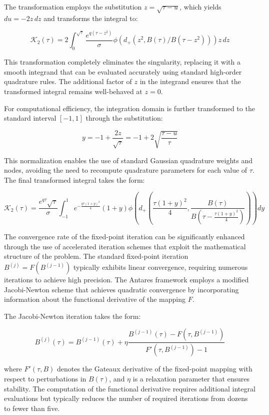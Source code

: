 \documentclass[
  american,
  11pt,
  11pt,
  letterpaper,
  onecolumn]{article}
\begin{document}
The transformation employs the substitution \(z = \sqrt{\tau - u}\),
which yields \(du = -2z \, dz\) and transforms the integral to:

\[\mathcal{K}_2(\tau) = 2\int_{0}^{\sqrt{\tau}} \frac{e^{q(\tau-z^2)}}{\sigma} \phi(d_+(z^2, B(\tau)/B(\tau-z^2))) z \, dz\]

This transformation completely eliminates the singularity, replacing it
with a smooth integrand that can be evaluated accurately using standard
high-order quadrature rules. The additional factor of \(z\) in the
integrand ensures that the transformed integral remains well-behaved at
\(z = 0\).

For computational efficiency, the integration domain is further
transformed to the standard interval \([-1, 1]\) through the
substitution:

\[y = -1 + \frac{2z}{\sqrt{\tau}} = -1 + 2\sqrt{\frac{\tau-u}{\tau}}\]

This normalization enables the use of standard Gaussian quadrature
weights and nodes, avoiding the need to recompute quadrature parameters
for each value of \(\tau\). The final transformed integral takes the
form:

\[\mathcal{K}_2(\tau) = \frac{e^{q\tau}\sqrt{\tau}}{\sigma} \int_{-1}^{1} e^{-\frac{q\tau(1+y)^2}{4}} (1+y) \phi\left(d_+\left(\frac{\tau(1+y)^2}{4}, \frac{B(\tau)}{B(\tau-\frac{\tau(1+y)^2}{4})}\right)\right) dy\]

The convergence rate of the fixed-point iteration can be significantly
enhanced through the use of accelerated iteration schemes that exploit
the mathematical structure of the problem. The standard fixed-point
iteration \(B^{(j)} = F(B^{(j-1)})\) typically exhibits linear
convergence, requiring numerous iterations to achieve high precision.
The Antares framework employs a modified Jacobi-Newton scheme that
achieves quadratic convergence by incorporating information about the
functional derivative of the mapping \(F\).

The Jacobi-Newton iteration takes the form:

\[B^{(j)}(\tau) = B^{(j-1)}(\tau) + \eta \frac{B^{(j-1)}(\tau) - F(\tau, B^{(j-1)})}{F'(\tau, B^{(j-1)}) - 1}\]

where \(F'(\tau, B)\) denotes the Gateaux derivative of the fixed-point
mapping with respect to perturbations in \(B(\tau)\), and \(\eta\) is a
relaxation parameter that ensures stability. The computation of the
functional derivative requires additional integral evaluations but
typically reduces the number of required iterations from dozens to fewer
than five.
\end{document}
